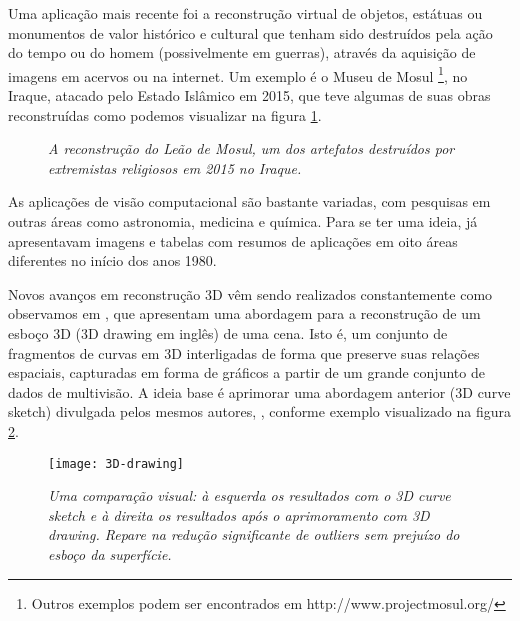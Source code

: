 Uma aplicação mais recente foi a reconstrução virtual de objetos, estátuas ou monumentos de valor histórico e cultural que tenham sido destruídos pela ação do tempo ou do homem (possivelmente em guerras), através da aquisição de imagens em acervos ou na internet. Um exemplo é o Museu de Mosul {\footnote{Outros exemplos podem ser encontrados em http://www.projectmosul.org/}}, no Iraque, atacado pelo 
Estado Islâmico em 2015, que teve algumas de suas obras reconstruídas como podemos visualizar na figura \ref{fig.mossul}.

\begin{figure}[!htb]
\centering
{}
\quad
{}
\caption{{\it A reconstrução do Leão de Mosul, um dos artefatos destruídos por extremistas religiosos em 2015 no Iraque.}}
\label{fig.mossul}
\end{figure}

As aplicações de visão computacional são bastante variadas, com pesquisas em outras áreas como astronomia, medicina e química. Para se ter uma ideia, \citep{ballard-82} já apresentavam imagens e tabelas com resumos de aplicações em oito áreas diferentes no início dos anos 1980.  

Novos avanços em reconstrução 3D vêm sendo realizados constantemente como observamos em \citep{fabbri-drawing}, que apresentam uma abordagem para a reconstrução de um esboço 3D (3D drawing em inglês) de uma cena. Isto é, um conjunto de fragmentos de curvas em 3D interligadas de forma que preserve suas relações espaciais, capturadas em forma de gráficos a partir de um grande conjunto de dados de multivisão. A ideia base é aprimorar uma abordagem anterior (3D curve sketch) divulgada pelos mesmos autores, \citep{fabbri-sketch}, conforme exemplo visualizado na figura \ref{fig.drawing}.
\begin{figure}[!htb]
\centering
\texttt{[image: 3D-drawing]}
\caption{{\it Uma comparação visual: à esquerda os resultados com o 3D curve sketch e à direita os resultados após o aprimoramento com 3D drawing. Repare na redução significante de outliers sem prejuízo do esboço da superfície.}}
\label{fig.drawing}
\end{figure}

